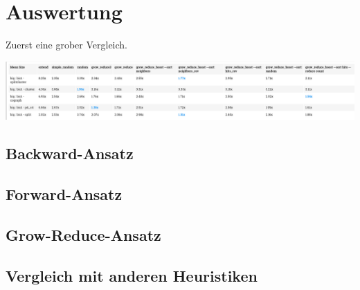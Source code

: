 \documentclass[12pt,a4paper,onecolumn,oneside,titlepage]{article}
\begin{document}
\section{Auswertung}
\label{sec:results}

Zuerst eine grober Vergleich.


\includegraphics[scale=0.3]{plots/table_all.png}

\subsection{Backward-Ansatz}
\subsection{Forward-Ansatz}
\subsection{Grow-Reduce-Ansatz}


\subsection{Vergleich mit anderen Heuristiken}
\label{sec:compare}
\end{document}
